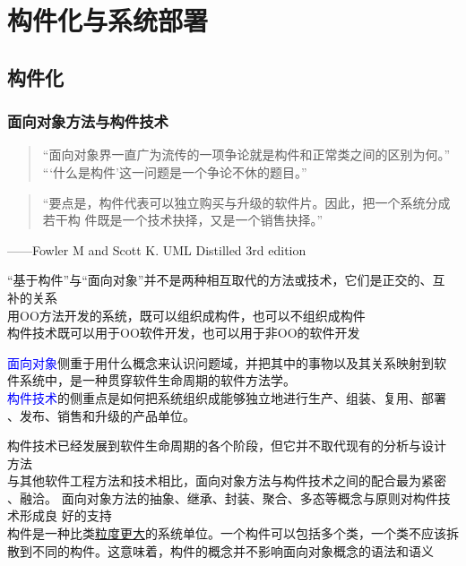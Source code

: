 \documentclass[compress]{beamer}
\begin{document}
\section{构件化与系统部署}

\subsection{构件化}

\begin{frame}
\frametitle{面向对象方法与构件技术}

 {
\begin{quote}
“面向对象界一直广为流传的一项争论就是构件和正常类之间的区别为何。” \\
“‘\alert{什么是构件}’这一问题是一个争论不休的题目。”
\end{quote}

\vspace*{2ex}

\begin{quote}
“要点是，构件代表可以独立购买与升级的软件片。因此，把一个系统分成若干构
件既是一个技术抉择，又是一个销售抉择。”
\end{quote}

——Fowler M and Scott K.  UML Distilled  3rd edition
}

 {
  “基于构件”与“面向对象”并不是两种相互取代的方法或技术，它们是正交的、互
  补的关系 \\[2ex]

  用OO方法开发的系统，既可以组织成构件，也可以不组织成构件 \\[2ex]

  构件技术既可以用于OO软件开发，也可以用于非OO的软件开发 \\[2ex]
}

 {
  \textcolor{blue}{面向对象}侧重于用什么概念来认识问题域，并把其中的事物以及其关系映射到软
  件系统中，是一种贯穿软件生命周期的软件方法学。 \\[4ex]

  \textcolor{blue}{构件技术}的侧重点是如何把系统组织成能够独立地进行生产、组装、复用、部署
  、发布、销售和升级的产品单位。
}

 {
  构件技术已经发展到软件生命周期的各个阶段，但它并不取代现有的分析与设计
  方法 \\[2ex]

  与其他软件工程方法和技术相比，面向对象方法与构件技术之间的配合最为紧密
  、融洽。 
  面向对象方法的抽象、继承、封装、聚合、多态等概念与原则对构件技术形成良
  好的支持 \\[2ex]

  构件是一种比类\uline{粒度更大}的系统单位。一个构件可以包括多个类，一个类不应该拆散到不同的构件。这意味着，构件的概念并不影响面向对象概念的语法和语义
}
\end{frame}
\end{document}
